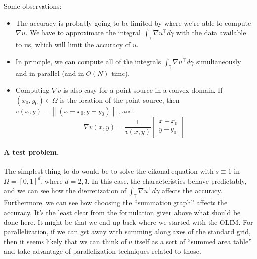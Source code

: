 \documentclass[12pt]{article}
\newcommand{\norm}[1]{\left\|#1\right\|}
\begin{document}
Some observations:
\begin{itemize}
\item The accuracy is probably going to be limited by where we're able
  to compute $\nabla u$. We have to approximate the integral
  $\int_\gamma \nabla u^\top d\gamma$ with the data available to us,
  which will limit the accuracy of $u$.
\item In principle, we can compute all of the integrals
  $\int_\gamma \nabla u^\top d\gamma$ simultaneously and in parallel
  (and in $O(N)$ time).
\item Computing $\nabla v$ is also easy for a point source in a convex
  domain. If $(x_0, y_0) \in \Omega$ is the location of the point
  source, then $v(x, y) = \norm{(x - x_0, y - y_0)}$, and:
  \begin{equation}
    \nabla v(x, y) = \frac{1}{v(x, y)} \begin{bmatrix}
      x - x_0 \\ y - y_0
    \end{bmatrix}
  \end{equation}
\end{itemize}

\paragraph{A test problem.} The simplest thing to do would be to solve
the eikonal equation with $s \equiv 1$ in $\Omega = [0, 1]^d$, where
$d = 2, 3$. In this case, the characteristics behave predictably, and
we can see how the discretization of
$\int_\gamma \nabla u^\top d\gamma$ affects the accuracy. Furthermore,
we can see how choosing the ``summation graph'' affects the
accuracy. It's the least clear from the formulation given above what
should be done here. It might be that we end up back where we started
with the OLIM. For parallelization, if we can get away with summing
along axes of the standard grid, then it seems likely that we can
think of $u$ itself as a sort of ``summed area table'' and take
advantage of parallelization techniques related to those.
\end{document}
